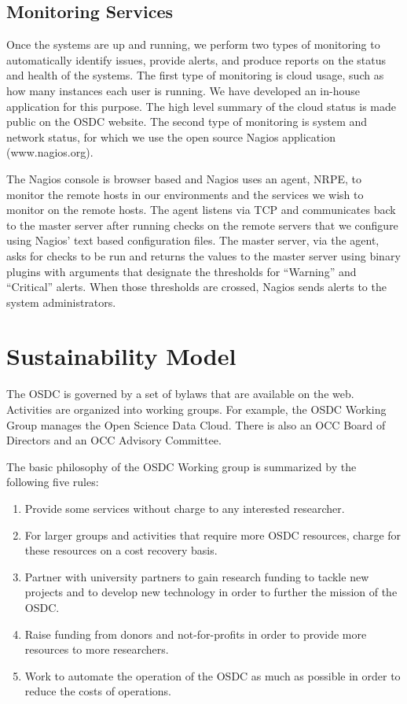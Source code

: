 \documentclass[11pt,twocolumn]{article}
\begin{document}
\subsection{Monitoring Services}
Once the systems are up and running, we perform two types of
monitoring to automatically identify issues, provide alerts, and
produce reports on the status and health of the systems. The first
type of monitoring is cloud usage, such as how many instances each
user is running. We have developed an in-house application for this
purpose. The high level summary of the cloud status is made public on
the OSDC website. The second type of monitoring is system and network
status, for which we use the open source Nagios application
(www.nagios.org).

The Nagios console is browser based and Nagios uses an agent, NRPE, to monitor
the remote hosts in our environments and the services we wish to
monitor on the remote hosts.  The agent listens via TCP and
communicates back to the master server after running checks on the
remote servers that we configure using Nagios' text based
configuration files.  The master server, via the agent, asks for
checks to be run and returns the values to the master server using
binary plugins with arguments that designate the thresholds for
``Warning'' and ``Critical'' alerts.  When those thresholds are crossed,
Nagios sends alerts to the system administrators. 



\section{Sustainability Model}

The OSDC is governed by a set of bylaws that are available on the web.   
Activities are organized into working groups.  For example, the OSDC Working Group
manages the Open Science Data Cloud.  There is also an OCC Board of Directors
and an OCC Advisory Committee.  

The basic philosophy of the OSDC Working group is summarized by the
following five rules:
\begin{enumerate}
\item Provide some services without charge to any interested researcher.
\item For larger groups and activities that require more OSDC
  resources, charge for these resources on a cost recovery basis.
\item Partner with university partners to gain research funding to
  tackle new projects and to develop new technology in order to
  further the mission of the OSDC.
\item Raise funding from donors and not-for-profits in order to
  provide more resources to more researchers.
\item Work to automate the operation of the OSDC as much as possible
in order to reduce the costs of operations.
\end{enumerate}
\end{document}
